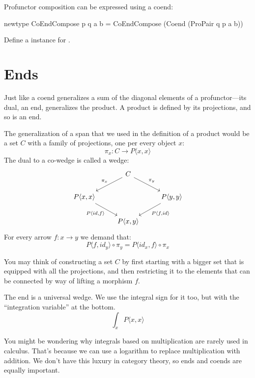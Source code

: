 \documentclass[DaoFP]{subfiles}
\begin{document}
\begin{exercise}
Profunctor composition can be expressed using a coend:
\begin{haskell}
newtype CoEndCompose p q a b = CoEndCompose (Coend (ProPair q p a b))
\end{haskell}
Define a  instance for .
\end{exercise}


\section{Ends}

Just like a coend generalizes a sum of the diagonal elements of a profunctor---its dual, an end, generalizes the product. A product is defined by its projections, and so is an end. 

The generalization of a span that we used in the definition of a product would be a set $C$ with a family of projections, one per every object $x$:
\[ \pi_x \colon C \to P \langle x, x \rangle \]
The dual to a co-wedge is called a wedge:
\[
 \begin{tikzcd}
 &C
 \arrow[ld, "\pi_x"']
 \arrow[rd, "\pi_y"]
 \\
 P \langle x, x \rangle
 \arrow[dr, "{P \langle id, f \rangle}"']
 &&P \langle y, y \rangle
 \arrow[dl, "{P \langle f, id \rangle}"]
 \\
 & P \langle x, y \rangle
 \end{tikzcd}
\]
For every arrow $f \colon x \to y$ we demand that:
\[ P \langle f, id_y \rangle \circ \pi_y = P \langle id_x, f \rangle \circ \pi_x \]

You may think of constructing a set $C$ by first starting with a bigger set that is equipped with all the projections, and then restricting it to the elements that can be connected by way of lifting a morphism $f$. 

The end is a universal wedge. We use the integral sign for it too, but with the ``integration variable'' at the bottom. 
\[ \int_x P \langle x, x \rangle \]

You might be wondering why integrals based on multiplication are rarely used in calculus. That's because we can use a logarithm to replace multiplication with addition. We don't have this luxury in category theory, so ends and coends are equally important.
\end{document}
